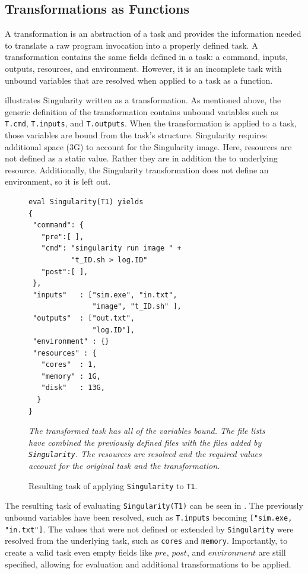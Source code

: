 \documentclass[conference]{IEEEtran}
\begin{document}
\subsection{Transformations as Functions}

A transformation is an abstraction of a task
and provides the information needed
to translate a raw program invocation into 
a properly defined task. 
A transformation contains the same fields defined in a task: 
a command, inputs, outputs, 
resources, and environment.
However, it is an incomplete task with 
unbound variables that are resolved 
when applied to a task as a function.

 illustrates  
Singularity written as a transformation.
As mentioned above, the generic definition of
the transformation contains unbound variables
such as {\tt T.cmd}, {\tt T.inputs}, and
{\tt T.outputs}. 
When the transformation is 
applied to a task, those variables
are bound from the task's structure.
Singularity requires
additional space (3G) to account 
for the Singularity image. 
Here, resources are not defined as
a static value.
Rather they are in addition the to 
underlying resource. 
Additionally, the Singularity transformation 
does not
define an environment, so it is left out. 


\begin{figure}[t]
\begin{framed}
\begin{verbatim}
eval Singularity(T1) yields
{
 "command": {
   "pre":[ ],
   "cmd": "singularity run image " +
          "t_ID.sh > log.ID"
   "post":[ ],
 },
 "inputs"   : ["sim.exe", "in.txt", 
               "image", "t_ID.sh" ],
 "outputs"  : ["out.txt", 
               "log.ID"],
 "environment" : {}
 "resources" : {
   "cores"  : 1, 
   "memory" : 1G, 
   "disk"   : 13G,
  }
}
\end{verbatim}
\end{framed}
\caption{Resulting task of applying {\tt Singularity} to {\tt T1}.}
\small
\emph{The transformed task has all of the variables bound.
The file lists have combined the previously defined files
with the files added by {\tt Singularity}.
The resources are resolved and the required values account
for the original task and the transformation.}
\label{sing-task}
\end{figure}


The resulting task of evaluating 
\verb$Singularity(T1)$
can be seen in .
The previously unbound variables have
been resolved, such as {\tt T.inputs}
becoming {\tt ["sim.exe, "in.txt"]}.
The values that were not defined or
extended by \verb$Singularity$ were
resolved from the underlying task,
such as {\tt cores} and {\tt memory}.
Importantly, to create a valid task
even empty fields like $pre$, $post$,
and $environment$ are still specified, 
allowing for evaluation and additional
transformations to be applied.
\end{document}
